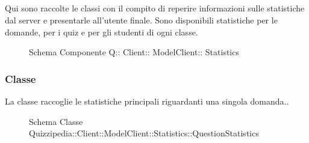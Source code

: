 \subsection{}
Qui sono raccolte le classi con il compito di reperire informazioni sulle statistiche dal server e presentarle all'utente finale. Sono disponibili statistiche per le domande, per i quiz e per gli studenti di ogni classe.
\begin{figure}[H]
\centering
\noindent{}
\caption[Schema Componente Quizzipedia::Client::ModelClient::Statistics]{Schema Componente Q:: Client:: ModelClient:: Statistics}
\end{figure}
\subsubsection{Classe }
La classe raccoglie le statistiche principali riguardanti una singola domanda..
\begin{figure}[H]
\centering
\noindent{}
\caption[Schema Classe QuestionStatistics]{Schema Classe Quizzipedia::Client::ModelClient::Statistics::QuestionStatistics}
\end{figure}
